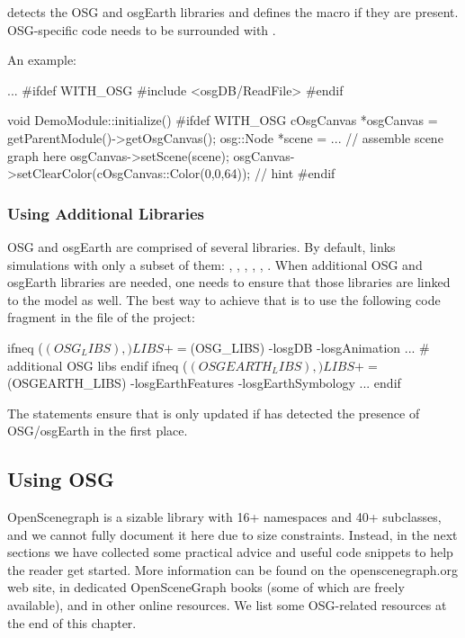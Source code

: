 {\opp} detects the OSG and osgEarth libraries and defines the  macro
if they are present. OSG-specific code needs to be surrounded with .

An example:

\begin{cpp}
...
#ifdef WITH_OSG
#include <osgDB/ReadFile>
#endif

void DemoModule::initialize()
{
#ifdef WITH_OSG
    cOsgCanvas *osgCanvas = getParentModule()->getOsgCanvas();
    osg::Node *scene = ... // assemble scene graph here
    osgCanvas->setScene(scene);
    osgCanvas->setClearColor(cOsgCanvas::Color(0,0,64)); // hint
#endif
}
\end{cpp}

\subsubsection{Using Additional Libraries}
\label{sec:graphics:using-additional-osg-libraries}

OSG and osgEarth are comprised of several libraries. By default, {\opp}
links simulations with only a subset of them: , ,
, , , . When
additional OSG and osgEarth libraries are needed, one needs to ensure that
those libraries are linked to the model as well. The best way to achieve that
is to use the following code fragment in the  file of the
project:

\begin{filelisting}
ifneq ($(OSG_LIBS),)
LIBS += $(OSG_LIBS) -losgDB -losgAnimation ... # additional OSG libs
endif
ifneq ($(OSGEARTH_LIBS),)
LIBS += $(OSGEARTH_LIBS) -losgEarthFeatures -losgEarthSymbology ...
endif
\end{filelisting}

The  statements ensure that  is only updated if {\opp} has detected
the presence of OSG/osgEarth in the first place.


\subsection{Using OSG}
\label{sec:graphics:using-osg}

OpenScenegraph is a sizable library with 16+ namespaces and 40+ 
subclasses, and we cannot fully document it here due to size constraints. Instead,
in the next sections we have collected some practical advice and useful code snippets
to help the reader get started. More information can be found on the openscenegraph.org
web site, in dedicated OpenSceneGraph books (some of which are freely available),
and in other online resources. We list some OSG-related resources at the end of this
chapter.

